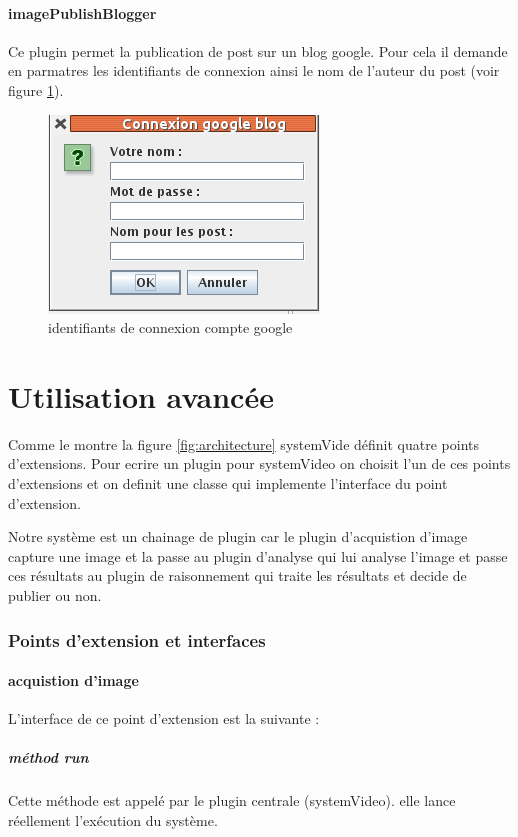 \documentclass[a4paper , 12pt]{article}
\begin{document}
\subsection{imagePublishBlogger}
Ce plugin permet la publication de post sur un blog google. Pour cela il demande en parmatres les identifiants de connexion ainsi le nom de l'auteur du post (voir figure \ref{fig:google}).

\begin{figure}
  \includegraphics[scale=0.45]{images/google.png}
  \caption{identifiants de connexion compte google}
  \label{fig:google}
\end{figure}

\part*{Utilisation avancée}
Comme le montre la figure \ref{fig:architecture} systemVide définit quatre points d'extensions. Pour ecrire un plugin pour systemVideo on choisit l'un de ces points d'extensions et on definit une classe qui implemente l'interface du point d'extension.

Notre système est un chainage de plugin car le plugin d'acquistion d'image capture une image et la passe au plugin d'analyse qui lui analyse l'image et passe ces résultats au plugin de raisonnement qui traite les résultats et decide de publier ou non.

  \section{Points d'extension et interfaces} 
  \subsection{acquistion d'image}
  L'interface de ce point d'extension est la suivante :
  
  \subsubsection*{méthod run}
  Cette méthode est appelé par le plugin centrale (systemVideo). elle lance réellement l'exécution du système.
\end{document}
